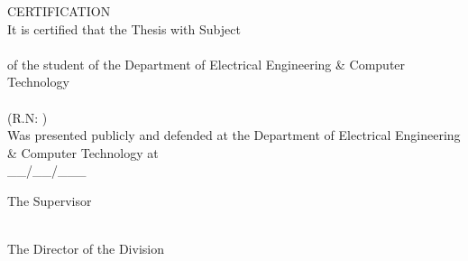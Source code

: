 \pagestyle{empty}
\begin{center}
{\LARGE CERTIFICATION\\[1cm]}
\large It is certified that the Thesis with Subject\\[1cm]
\textbf{\large \doctitle }\\[1cm]
of the student of the Department of Electrical Engineering \& Computer Technology\\[1.5cm]
\me \\[0.5cm]
(R.N: \studnum )\\[1.5cm]
Was presented publicly and defended at the Department of Electrical Engineering \& Computer Technology at\\[1cm]
\Large{\_\_/\_\_/\_\_\_}\\[1.5cm]
\end{center}
\begin{minipage}{0.5\textwidth}
\begin{flushleft} \large
The Supervisor\\[2cm]
\supname \\

\end{flushleft}
\end{minipage}
\begin{minipage}{0.5\textwidth}
\begin{flushright} \large
The Director of the Division\\[2cm]
\headofdivision\\
\emph{\headofdivisiontitle}
\end{flushright}
\end{minipage}
